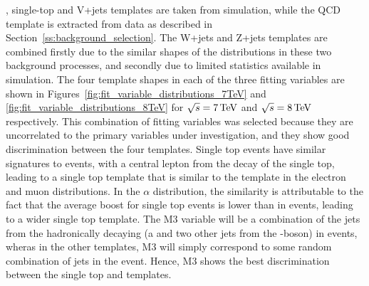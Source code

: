 \ttbar, single-top and V+jets templates are taken from simulation, while the QCD template is extracted from
data as described in Section~\ref{ss:background_selection}. The W+jets and Z+jets templates are combined
firstly due to the similar shapes of the distributions in these two background processes, and secondly due to
limited statistics available in simulation. The four template shapes in each of the three fitting variables
are shown in Figures~\ref{fig:fit_variable_distributions_7TeV} and \ref{fig:fit_variable_distributions_8TeV} for $\sqrt{s}=7\,\text{Te\hspace{-.08em}V}$ and $\sqrt{s}=8\,\text{Te\hspace{-.08em}V}$ respectively. This combination of fitting variables was selected because they are uncorrelated to the primary variables under
investigation, and they show good discrimination between the four templates.
Single top events have similar signatures to \ttbar events, with a central lepton from the decay of the single
top, leading to a single top template that is similar to the \ttbar template in the electron \abseta and muon
\abseta distributions. In the $\alpha$ distribution, the similarity is attributable to the fact that the
average boost for single top events is lower than in \ttbar events, leading to a wider single top template.
The M3 variable will be a combination of the jets from the hadronically decaying \tquark (a \bjet and two
other jets from the \W-boson) in \ttbar events, wheras in the other templates, M3 will simply correspond to
some random combination of jets in the event. Hence, M3 shows the best discrimination between the single top
and \ttbar templates.

